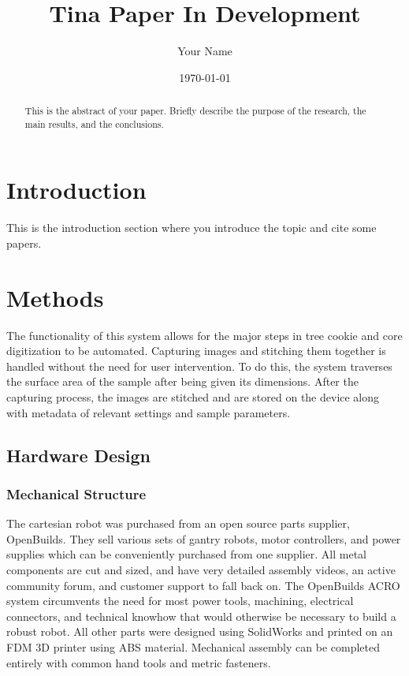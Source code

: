 \documentclass[a4paper,12pt]{article}
\title{Tina Paper In Development}
\author{Your Name}
\date{\today}
\begin{document}
\maketitle

\begin{abstract}
    This is the abstract of your paper. Briefly describe the purpose of the research, the main results, and the conclusions.
\end{abstract}

\section{Introduction}
This is the introduction section where you introduce the topic and cite some papers.

\section{Methods}
The functionality of this system allows for the major steps in tree cookie and core digitization to be automated. Capturing images and stitching them together is handled without the need for user intervention. 
To do this, the system traverses the surface area of the sample after being given its dimensions. After the capturing process, the images are stitched and are stored on the device along with metadata of relevant 
settings and sample parameters.

\subsection{Hardware Design}

\subsubsection{Mechanical Structure}
The cartesian robot was purchased from an open source parts supplier, OpenBuilds. They sell various sets of gantry robots, motor controllers, and power supplies
which can be conveniently purchased from one supplier. All metal components are cut and sized, and have very detailed assembly videos, an active community forum,
and customer support to fall back on. The OpenBuilds ACRO system circumvents the need for most power tools, machining, electrical connectors, and technical knowhow that would otherwise be necessary to build a robust robot.
All other parts were designed using SolidWorks and printed on an FDM 3D printer using ABS material. Mechanical assembly can be completed entirely with common hand tools and metric fasteners. 
\end{document}
